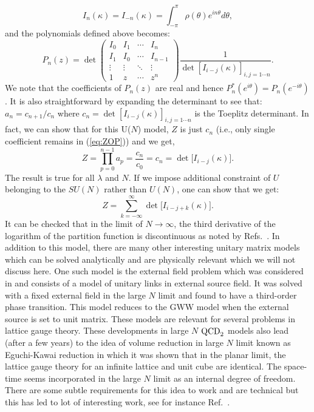 \documentclass[letter,11pt]{article}
\begin{document}
\begin{equation}
	I_{n}(\kappa) = I_{-n}(\kappa) = \int_{-\pi}^{\pi} \rho(\theta) e^{i n \theta}d\theta, 
\end{equation}
and the polynomials defined above becomes:
\begin{equation}
	P_{n}(z) = \det
	\begin{pmatrix}
		I_0 & I_1 & \cdots & I_n \\
		I_1 & I_0 & \cdots & I_{n-1} \\
		\vdots  & \vdots  & \ddots & \vdots  \\
		1 & z & \cdots & z^n 
			\end{pmatrix}
		 \frac{1}{\det [I_{i-j} (\kappa)]_{i,j = 1 \cdots n}}. 
\end{equation}
We note that the coefficients of $P_{n}(z)$ are real and hence $P_{n}^{*}(e^{i\theta}) = P_{n}(e^{-i\theta})$. It is also straightforward by expanding the determinant to see that: $a_{n} = c_{n+1}/c_{n}$ where $c_{n} = \det [I_{i-j}(\kappa)]_{i,j = 1 \cdots n}$ is the Toeplitz determinant. 
In fact, we can show that for this U($N$) model, $Z$ is just $c_{n}$ (i.e., only single coefficient remains in (\ref{eq:ZOP})) and we get, 
\begin{equation}
\label{eq:GWW_ex} 
Z = \prod_{p=0}^{n-1} a_{p} = \frac{c_n}{c_0} = c_{n} = \det \Big[I_{i-j}(\kappa) \Big].
\end{equation}
The result is true for all $\lambda$ and $N$. If we impose additional constraint of 
$U$ belonging to the $SU(N)$ rather than $U(N)$, one can show that
we get:
\begin{equation}
\label{eq:GWW_ex2} 
Z = \sum_{k=-\infty}^{\infty} \det \Big[I_{i-j+k}(\kappa) \Big].
\end{equation}
It can be checked that in the limit of $N \to \infty$, the third derivative of the logarithm of the partition function is discontinuous as noted by Refs.~\cite{Gross:1980he, Wadia:2012fr}. In addition to this model, there are many other interesting unitary 
matrix models which can be solved analytically
and are physically relevant which we will not discuss here. 
One such model is the external field problem which was considered in \cite{Brezin:1980rk} and consists of a model of unitary links in external source field. It was solved with a fixed external field in the large $N$ limit and found to have a third-order phase transition. This model reduces to the GWW model when the external source is set to unit matrix.  These models are relevant for several problems in lattice gauge theory. These developments in large $N$ $\rm{QCD}_{2}$ models also lead (after a few years) to the idea of volume reduction in large $N$ limit known as Eguchi-Kawai reduction \cite{Eguchi:1982nm} in which it was shown that in the planar limit, the lattice gauge theory for an infinite lattice and unit cube are identical. The space-time seems incorporated in the large $N$ limit as an internal degree of freedom. There are some subtle requirements for this idea to work and are technical but this has led to lot of interesting work, see for instance Ref.~\cite{Kovtun:2007py}. 
 
\end{document}
